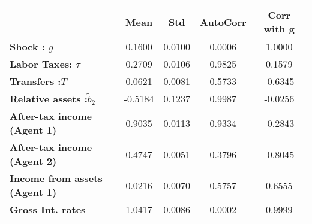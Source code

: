 \begin{tiny}\begin{tabular}{|l|c|c|c|c|}
\hline
&\textbf{Mean}&\textbf{Std}&\textbf{AutoCorr}&\textbf{Corr with g}\\\hline
\textbf{Shock : $g$}&0.1600&0.0100&0.0006&1.0000\\\hline
\textbf{Labor Taxes: $\tau$}&0.2709&0.0106&0.9825&0.1579\\\hline
\textbf{Transfers :$T$}&0.0621&0.0081&0.5733&-0.6345\\\hline
\textbf{Relative assets  :$\tilde{b}_2$}&-0.5184&0.1237&0.9987&-0.0256\\\hline
\textbf{After-tax income (Agent 1)}&0.9035&0.0113&0.9334&-0.2843\\\hline
\textbf{After-tax income (Agent 2)}&0.4747&0.0051&0.3796&-0.8045\\\hline
\textbf{Income from assets (Agent 1)}&0.0216&0.0070&0.5757&0.6555\\\hline
\textbf{Gross Int. rates}&1.0417&0.0086&0.0002&0.9999\\\hline
\end{tabular}
\end{tiny}